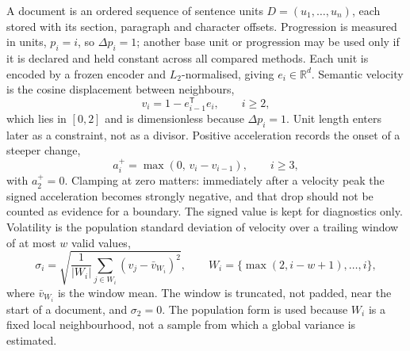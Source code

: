 \documentclass[10pt,a4paper]{article}
\begin{document}
A document is an ordered sequence of sentence units $D=(u_1,\ldots,u_n)$, each stored with its section, paragraph and character offsets. Progression is measured in units, $p_i=i$, so $\Delta p_i=1$; another base unit or progression may be used only if it is declared and held constant across all compared methods. Each unit is encoded by a frozen encoder and $L_2$-normalised, giving $e_i\in\mathbb{R}^d$. Semantic velocity is the cosine displacement between neighbours,
\begin{equation}
v_i = 1 - e_{i-1}^{\mathsf T}e_i, \qquad i\ge 2,
\label{eq:velocity}
\end{equation}
which lies in $[0,2]$ and is dimensionless because $\Delta p_i=1$. Unit length enters later as a constraint, not as a divisor. Positive acceleration records the onset of a steeper change,
\begin{equation}
a_i^+ = \max(0,\, v_i - v_{i-1}), \qquad i\ge 3,
\label{eq:acceleration}
\end{equation}
with $a_2^+=0$. Clamping at zero matters: immediately after a velocity peak the signed acceleration becomes strongly negative, and that drop should not be counted as evidence for a boundary. The signed value is kept for diagnostics only. Volatility is the population standard deviation of velocity over a trailing window of at most $w$ valid values,
\begin{equation}
\sigma_i = \sqrt{\frac{1}{|W_i|}\sum_{j\in W_i}\left(v_j-\bar v_{W_i}\right)^2},\qquad W_i=\{\max(2,i-w+1),\ldots,i\},
\label{eq:volatility}
\end{equation}
where $\bar v_{W_i}$ is the window mean. The window is truncated, not padded, near the start of a document, and $\sigma_2=0$. The population form is used because $W_i$ is a fixed local neighbourhood, not a sample from which a global variance is estimated.
\end{document}
